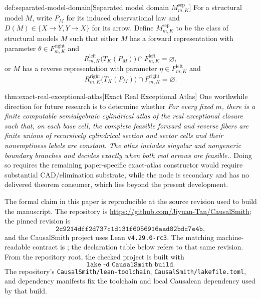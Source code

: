 \documentclass[11pt]{article}
\begin{document}
\begin{definitionv}{def:separated-model-domain}[Separated model domain \(M^{\mathrm{sep}}_{m,K}\)]
For a structural model \(M\), write \(P_M\) for its induced observational law and \(D(M)\in\{X\to Y,Y\to X\}\) for its arrow. Define \(M^{\mathrm{sep}}_{m,K}\) to be the class of structural models \(M\) such that either \(M\) has a forward representation with parameter \(\theta\in F^{\mathrm{right}}_{m,K}\) and
\[
R^{\mathrm{left}}_{m,K}\bigl(T_K(P_M)\bigr)\cap F^{\mathrm{left}}_{m,K}=\varnothing,
\]
or \(M\) has a reverse representation with parameter \(\eta\in F^{\mathrm{left}}_{m,K}\) and
\[
R^{\mathrm{right}}_{m,K}\bigl(T_K(P_M)\bigr)\cap F^{\mathrm{right}}_{m,K}=\varnothing.
\]
\end{definitionv}

\begin{remarkv}{thm:exact-real-exceptional-atlas}[Exact Real Exceptional Atlas]
One worthwhile direction for future research is to determine whether \emph{For every fixed \(m\), there is a finite computable semialgebraic cylindrical atlas of the real exceptional closure such that, on each base cell, the complete feasible forward and reverse fibers are finite unions of recursively cylindrical section and sector cells and their nonemptiness labels are constant. The atlas includes singular and nongeneric boundary branches and decides exactly when both real arrows are feasible.}. Doing so requires the remaining paper-specific exact-atlas constructor would require substantial CAD/elimination substrate, while the node is secondary and has no delivered theorem consumer, which lies beyond the present development.
\end{remarkv}

The formal claim in this paper is reproducible at the source revision used to build the manuscript. The repository is \url{https://github.com/Jiyuan-Tan/CausalSmith}; the pinned revision is
\[
\texttt{2c9214dff2d737c1d131f6056916aad82bdc7e4b},
\]
and the CausalSmith project uses Lean \texttt{v4.29.0-rc3}. The matching
machine-readable contract is
;
the declaration table below refers to that same revision. From the repository
root, the checked project is built with
\[
\texttt{lake -d CausalSmith build}.
\]
The repository's \texttt{CausalSmith/lean-toolchain}, \texttt{CausalSmith/lakefile.toml}, and dependency manifests fix the toolchain and local Causalean dependency used by that build.
\end{document}
